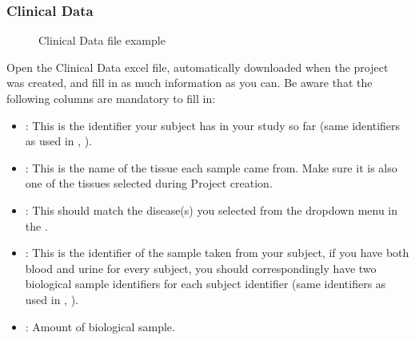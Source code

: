 \documentclass[letterpaper,10pt,english]{sphinxmanual}
\begin{document}
\subsubsection{Clinical Data}
\label{\detokenize{getting_started/upload-data:clinical-data}}
\begin{figure}[htbp]
\centering
\capstart

\noindent{}
\caption{Clinical Data file example}\label{\detokenize{getting_started/upload-data:id4}}\end{figure}

Open the Clinical Data excel file, automatically downloaded when the project was created, and fill in as much information as you can.
Be aware that the following columns are mandatory to fill in:
\begin{itemize}
\item {} 
: This is the identifier your subject has in your study so far (same identifiers as used in {\hyperref[\detokenize{getting_started/upload-data:experimental-design}]{}}, ).

\item {} 
: This is the name of the tissue each sample came from. Make sure it is also one of the tissues selected during Project creation.

\item {} 
: This should match the disease(s) you selected from the drop\sphinxhyphen{}down menu in the {\hyperref[\detokenize{getting_started/create-new-project:project-creation}]{}}.

\item {} 
: This is the identifier of the sample taken from your subject, if you have both blood and urine for every subject, you should correspondingly have two biological sample identifiers for each subject identifier (same identifiers as used in {\hyperref[\detokenize{getting_started/upload-data:experimental-design}]{}}, ).

\item {} 
: Amount of biological sample.


\end{itemize}
\end{document}
